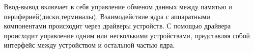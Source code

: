 Ввод-вывод включает в себя управление обменом данных между памятью и периферией(диски,терминалы). Взаимодействие ядра с аппаратными компонентами происходит через драйверы устройств. С помощью драйвера происходит управление одним или несколькими устройствами, представляя собой интерфейс между устройством и остальной частью ядра.
